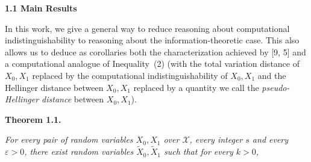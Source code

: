 \par\medskip\noindent\textbf{
1.1 Main Results}\par




In this work, we give a general way to reduce reasoning about computational indistinguishability to reasoning about the information-theoretic case. This also allows us to deduce as corollaries both the characterization achieved by [9, 5] and a computational analogue of Inequality (2) (with the total variation distance of $X_{0},X_{1}$ replaced by the computational indistinguishability of $X_{0},X_{1}$ and the Hellinger distance between $X_{0},X_{1}$ replaced by a quantity we call the \emph{pseudo-Hellinger distance} between $X_{0},X_{1}$).\par





\par\medskip\noindent\textbf{
\textbf{Theorem 1.1}\textbf{.}
}\par



\emph{For every pair of random variables $X_{0},X_{1}$ over $\mathcal{X}$, every integer $s$ and every $\varepsilon>0$, there exist random variables $\widetilde{X}_{0},\widetilde{X}_{1}$ such that for every $k>0$,}\par


